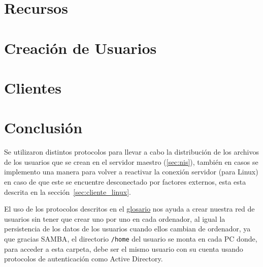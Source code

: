 \documentclass[journal]{IEEEtran}
\begin{document}
\cleardoublepage{}

\section{Recursos}\label{sec:recursos}



\cleardoublepage{}

\section{Creación de Usuarios}\label{sec:cusuarios}



\cleardoublepage{}

\section{Clientes}\label{sec:clientes}


\newpage{}
\section{Conclusión}\label{sec:conclusion}
Se utilizaron distintos protocolos para llevar a cabo la distribución
de los archivos de los usuarios que se crean en el servidor
maestro (\ref{sec:nis}), también en casos se implemento una manera para
volver a reactivar la conexión servidor (para Linux) en caso de
que este se encuentre
desconectado por factores externos, esta esta descrita en la
sección~\ref{sec:cliente_linux}.

El uso de los protocolos descritos en el \hyperref[glo:glosario]{glosario}
nos ayuda a crear nuestra red de usuarios sin tener que crear uno por uno
en cada ordenador, al igual la persistencia de los datos de los usuarios cuando
ellos cambian de ordenador, ya que gracias \Gls{SAMBA}, el directorio
\texttt{/home} del usuario se monta en cada PC donde, para acceder a esta
carpeta, debe ser el mismo usuario con su cuenta usando protocolos de
autenticación como Active Directory.


\vfill{}

\listoffigures
{}
\listoflistings{}
\printglossary{}\label{glo:glosario}
\printglossary[type=\acronymtype]
\end{document}
